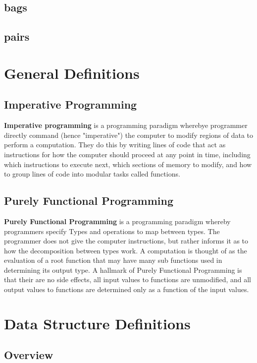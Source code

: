 \documentclass[12pt, letterpaper]{book}
\begin{document}
	\section{bags}
	\section{pairs}



\chapter{General Definitions}

\section{Imperative Programming}

\textbf{Imperative programming} is a programming paradigm wherebye programmer directly command (hence "imperative") the computer to modify regions of data to perform a computation. They do this by writing lines of code that act as instructions for how the computer should proceed at any point in time, including which instructions to execute next, which sections of memory to modify, and how to group lines of code into modular tasks called functions. 

\section{Purely Functional Programming}

\textbf{Purely Functional Programming} is a programming paradigm whereby programmers specify Types and operations to map between types. The programmer does not give the computer instructions, but rather informs it as to how the decomposition between types work. A computation is thought of as the evaluation of a root function that may have many sub functions used in determining its output type.
A hallmark of Purely Functional Programming is that their are no side effects, all input values to functions are unmodified, and all output values to functions are determined only as a function of the input values.

\chapter{Data Structure Definitions}

\section{Overview}
\end{document}
